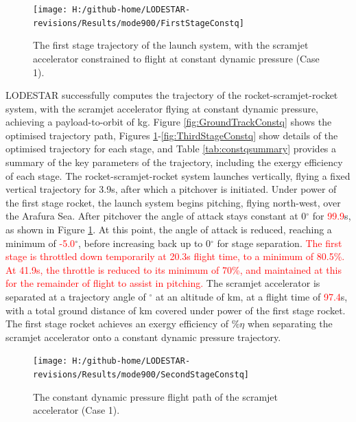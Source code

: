 \begin{figure}[ht!] %
	\centering
	\texttt{[image: H:/github-home/LODESTAR-revisions/Results/mode900/FirstStageConstq]}
	\caption{The first stage trajectory of the launch system, with the scramjet accelerator constrained to flight at constant dynamic pressure (Case 1).}
	\label{fig:FirstStageConstq}
\end{figure}
LODESTAR successfully computes the trajectory of the rocket-scramjet-rocket system, with the scramjet accelerator flying at constant dynamic pressure, achieving a payload-to-orbit of \PayloadToOrbitConstqNoReturn kg.
Figure \ref{fig:GroundTrackConstq} shows the optimised trajectory path, Figures \ref{fig:FirstStageConstq}-\ref{fig:ThirdStageConstq} show details of the optimised trajectory for each stage, and Table \ref{tab:constqsummary} provides a summary of the key parameters of the trajectory, including the exergy efficiency of each stage.
The rocket-scramjet-rocket system launches vertically, flying a fixed vertical trajectory for 3.9s, after which a pitchover is initiated. Under power of the first stage rocket, the launch system begins pitching, flying north-west, over the Arafura Sea. 
After pitchover the angle of attack stays constant at 0$^\circ$ for \textcolor{red}{99.9}s, as shown in Figure \ref{fig:FirstStageConstq}. At this point, the angle of attack is reduced, reaching a minimum of \textcolor{red}{-5.0}$^\circ$, before increasing back up to 0$^\circ$ for stage separation. \textcolor{red}{The first stage is throttled down temporarily at 20.3s flight time, to a minimum of 80.5\%. At 41.9s, the throttle is reduced to its minimum of 70\%, and maintained at this for the remainder of flight to assist in pitching. }
The scramjet accelerator is separated at a trajectory angle of \firstsecondSeparationgammaConstqNoReturn$^\circ$ at an altitude of \firstsecondSeparationAltConstqNoReturn km, at a flight time of \textcolor{red}{97.4}s, with a total ground distance of \FirstStageDistStandardNoReturn km covered under power of the first stage rocket. 
The first stage rocket achieves an exergy efficiency of \firstExergyEffConstqNoReturn\%$\eta$ when separating the scramjet accelerator onto a constant dynamic pressure trajectory. 


\begin{figure}[ht!]%
\centering
\texttt{[image: H:/github-home/LODESTAR-revisions/Results/mode900/SecondStageConstq]}
\caption{The constant dynamic pressure flight path of the scramjet accelerator (Case 1).}
\label{fig:SecondStageConstq}
\end{figure}


